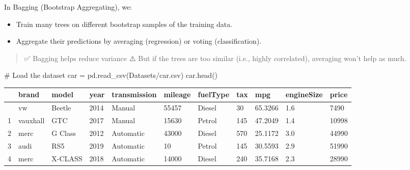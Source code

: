 \documentclass[
  letterpaper,
  DIV=11,
  numbers=noendperiod]{scrreprt}
\newenvironment{Shaded}{\begin{snugshade}}{\end{snugshade}}
\newcommand{\CommentTok}[1]{\textcolor[rgb]{0.37,0.37,0.37}{#1}}
\newcommand{\NormalTok}[1]{\textcolor[rgb]{0.00,0.23,0.31}{#1}}
\newcommand{\OperatorTok}[1]{\textcolor[rgb]{0.37,0.37,0.37}{#1}}
\newcommand{\StringTok}[1]{\textcolor[rgb]{0.13,0.47,0.30}{#1}}
\begin{document}
In Bagging (Bootstrap Aggregating), we:

\begin{itemize}
\item
  Train many trees on different bootstrap samples of the training data.
\item
  Aggregate their predictions by averaging (regression) or voting
  (classification).
\end{itemize}

\begin{quote}
✅ Bagging helps reduce variance ⚠️ But if the trees are too similar
(i.e., highly correlated), averaging won't help as much.
\end{quote}

\begin{Shaded}
\begin{Highlighting}[]
\CommentTok{\# Load the dataset}
\NormalTok{car }\OperatorTok{=}\NormalTok{ pd.read\_csv(}\StringTok{\textquotesingle{}Datasets/car.csv\textquotesingle{}}\NormalTok{)}
\NormalTok{car.head()}
\end{Highlighting}
\end{Shaded}

\begin{longtable}[]{@{}lllllllllll@{}}
\toprule\noalign{}
& brand & model & year & transmission & mileage & fuelType & tax & mpg &
engineSize & price \\
\midrule\noalign{}
\endhead
\bottomrule\noalign{}
\endlastfoot
0 & vw & Beetle & 2014 & Manual & 55457 & Diesel & 30 & 65.3266 & 1.6 &
7490 \\
1 & vauxhall & GTC & 2017 & Manual & 15630 & Petrol & 145 & 47.2049 &
1.4 & 10998 \\
2 & merc & G Class & 2012 & Automatic & 43000 & Diesel & 570 & 25.1172 &
3.0 & 44990 \\
3 & audi & RS5 & 2019 & Automatic & 10 & Petrol & 145 & 30.5593 & 2.9 &
51990 \\
4 & merc & X-CLASS & 2018 & Automatic & 14000 & Diesel & 240 & 35.7168 &
2.3 & 28990 \\
\end{longtable}
\end{document}
